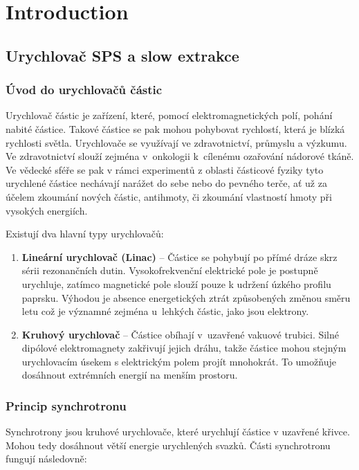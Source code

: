 \chapter*{Introduction}
{}

\section{Urychlovač SPS a slow extrakce}
\subsection{Úvod do urychlovačů částic}
Urychlovač částic je zařízení, které, pomocí elektromagnetických polí, pohání nabité částice. Takové částice se pak mohou pohybovat rychlostí, která je blízká rychlosti světla. Urychlovače se využívají ve zdravotnictví, průmyslu a výzkumu. Ve zdravotnictví slouží zejména v~onkologii k~cílenému ozařování nádorové tkáně. Ve vědecké sféře se pak v rámci experimentů z oblasti částicové fyziky tyto urychlené částice nechávají narážet do sebe nebo do pevného terče, ať už za účelem zkoumání nových částic, antihmoty, či zkoumání vlastností hmoty při vysokých energiích.

Existují dva hlavní typy urychlovačů:
\begin{enumerate}
	\item \textbf{Lineární urychlovač (Linac)} -- Částice se pohybují po přímé dráze skrz sérii rezonančních dutin. Vysokofrekvenční elektrické pole je postupně urychluje, zatímco magnetické pole slouží pouze k udržení úzkého profilu paprsku. Výhodou je absence energetických ztrát způsobených změnou směru letu což je významné
	zejména u~lehkých částic, jako jsou elektrony.
	\item \textbf{Kruhový urychlovač} -- Částice obíhají v~uzavřené vakuové trubici. Silné dipólové elektromagnety zakřivují jejich dráhu, takže částice mohou stejným urychlovacím úsekem s elektrickým polem projít mnohokrát. To umožňuje dosáhnout extrémních energií na menším prostoru.
\end{enumerate}





\subsection{Princip synchrotronu}
Synchrotrony jsou kruhové urychlovače, které urychlují částice v uzavřené křivce. Mohou tedy dosáhnout větší energie urychlených svazků. Části synchrotronu fungují následovně:

